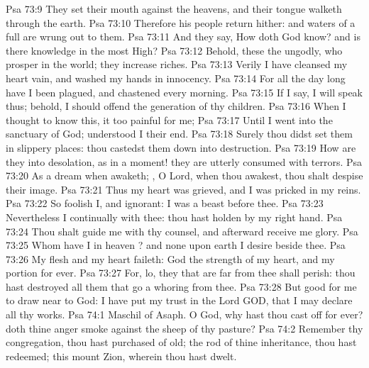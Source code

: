 \vs Psa 73:9 They set their mouth against the heavens, and their tongue walketh through the earth.
\vs Psa 73:10 Therefore his people return hither: and waters of a full  are wrung out to them.
\vs Psa 73:11 And they say, How doth God know? and is there knowledge in the most High?
\vs Psa 73:12 Behold, these  the ungodly, who prosper in the world; they increase  riches.
\vs Psa 73:13 Verily I have cleansed my heart  vain, and washed my hands in innocency.
\vs Psa 73:14 For all the day long have I been plagued, and chastened every morning.
\vs Psa 73:15 If I say, I will speak thus; behold, I should offend  the generation of thy children.
\vs Psa 73:16 When I thought to know this, it  too painful for me;
\vs Psa 73:17 Until I went into the sanctuary of God;  understood I their end.
\vs Psa 73:18 Surely thou didst set them in slippery places: thou castedst them down into destruction.
\vs Psa 73:19 How are they  into desolation, as in a moment! they are utterly consumed with terrors.
\vs Psa 73:20 As a dream when  awaketh; , O Lord, when thou awakest, thou shalt despise their image.
\vs Psa 73:21 Thus my heart was grieved, and I was pricked in my reins.
\vs Psa 73:22 So foolish  I, and ignorant: I was  a beast before thee.
\vs Psa 73:23 Nevertheless I  continually with thee: thou hast holden  by my right hand.
\vs Psa 73:24 Thou shalt guide me with thy counsel, and afterward receive me  glory.
\vs Psa 73:25 Whom have I in heaven ? and  none upon earth  I desire beside thee.
\vs Psa 73:26 My flesh and my heart faileth:  God  the strength of my heart, and my portion for ever.
\vs Psa 73:27 For, lo, they that are far from thee shall perish: thou hast destroyed all them that go a whoring from thee.
\vs Psa 73:28 But  good for me to draw near to God: I have put my trust in the Lord GOD, that I may declare all thy works.
\vs Psa 74:1 Maschil of Asaph. O God, why hast thou cast  off for ever?  doth thine anger smoke against the sheep of thy pasture?
\vs Psa 74:2 Remember thy congregation,  thou hast purchased of old; the rod of thine inheritance,  thou hast redeemed; this mount Zion, wherein thou hast dwelt.
